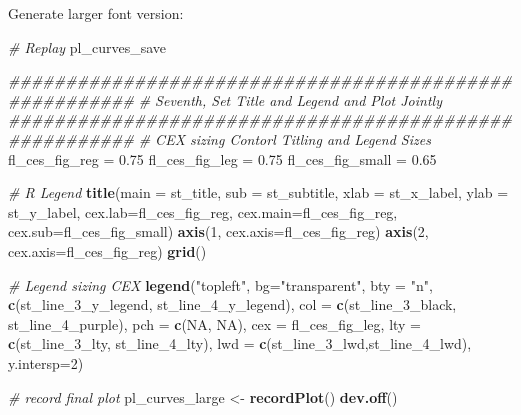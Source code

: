 \documentclass[
]{book}
\newenvironment{Shaded}{\begin{snugshade}}{\end{snugshade}}
\newcommand{\CommentTok}[1]{\textcolor[rgb]{0.56,0.35,0.01}{\textit{#1}}}
\newcommand{\DataTypeTok}[1]{\textcolor[rgb]{0.13,0.29,0.53}{#1}}
\newcommand{\DecValTok}[1]{\textcolor[rgb]{0.00,0.00,0.81}{#1}}
\newcommand{\FloatTok}[1]{\textcolor[rgb]{0.00,0.00,0.81}{#1}}
\newcommand{\KeywordTok}[1]{\textcolor[rgb]{0.13,0.29,0.53}{\textbf{#1}}}
\newcommand{\NormalTok}[1]{#1}
\newcommand{\OtherTok}[1]{\textcolor[rgb]{0.56,0.35,0.01}{#1}}
\newcommand{\StringTok}[1]{\textcolor[rgb]{0.31,0.60,0.02}{#1}}
\begin{document}
Generate larger font version:

\begin{Shaded}
\begin{Highlighting}[]
\CommentTok{# Replay}
\NormalTok{pl_curves_save}

\CommentTok{#######################################################}
\CommentTok{# Seventh, Set Title and Legend and Plot Jointly}
\CommentTok{#######################################################}
\CommentTok{# CEX sizing Contorl Titling and Legend Sizes}
\NormalTok{fl_ces_fig_reg =}\StringTok{ }\FloatTok{0.75}
\NormalTok{fl_ces_fig_leg =}\StringTok{ }\FloatTok{0.75}
\NormalTok{fl_ces_fig_small =}\StringTok{ }\FloatTok{0.65}

\CommentTok{# R Legend}
\KeywordTok{title}\NormalTok{(}\DataTypeTok{main =}\NormalTok{ st_title, }\DataTypeTok{sub =}\NormalTok{ st_subtitle, }\DataTypeTok{xlab =}\NormalTok{ st_x_label, }\DataTypeTok{ylab =}\NormalTok{ st_y_label,}
      \DataTypeTok{cex.lab=}\NormalTok{fl_ces_fig_reg,}
      \DataTypeTok{cex.main=}\NormalTok{fl_ces_fig_reg,}
      \DataTypeTok{cex.sub=}\NormalTok{fl_ces_fig_small)}
\KeywordTok{axis}\NormalTok{(}\DecValTok{1}\NormalTok{, }\DataTypeTok{cex.axis=}\NormalTok{fl_ces_fig_reg)}
\KeywordTok{axis}\NormalTok{(}\DecValTok{2}\NormalTok{, }\DataTypeTok{cex.axis=}\NormalTok{fl_ces_fig_reg)}
\KeywordTok{grid}\NormalTok{()}

\CommentTok{# Legend sizing CEX}
\KeywordTok{legend}\NormalTok{(}\StringTok{"topleft"}\NormalTok{,}
       \DataTypeTok{bg=}\StringTok{"transparent"}\NormalTok{,}
       \DataTypeTok{bty =} \StringTok{"n"}\NormalTok{,}
       \KeywordTok{c}\NormalTok{(st_line_}\DecValTok{3}\NormalTok{_y_legend, st_line_}\DecValTok{4}\NormalTok{_y_legend),}
       \DataTypeTok{col =} \KeywordTok{c}\NormalTok{(st_line_}\DecValTok{3}\NormalTok{_black, st_line_}\DecValTok{4}\NormalTok{_purple),}
       \DataTypeTok{pch =} \KeywordTok{c}\NormalTok{(}\OtherTok{NA}\NormalTok{, }\OtherTok{NA}\NormalTok{),}
       \DataTypeTok{cex =}\NormalTok{ fl_ces_fig_leg,}
       \DataTypeTok{lty =} \KeywordTok{c}\NormalTok{(st_line_}\DecValTok{3}\NormalTok{_lty, st_line_}\DecValTok{4}\NormalTok{_lty),}
       \DataTypeTok{lwd =} \KeywordTok{c}\NormalTok{(st_line_}\DecValTok{3}\NormalTok{_lwd,st_line_}\DecValTok{4}\NormalTok{_lwd),}
       \DataTypeTok{y.intersp=}\DecValTok{2}\NormalTok{)}
\end{Highlighting}
\end{Shaded}

\begin{Shaded}
\begin{Highlighting}[]
\CommentTok{# record final plot}
\NormalTok{pl_curves_large <-}\StringTok{ }\KeywordTok{recordPlot}\NormalTok{()}
\KeywordTok{dev.off}\NormalTok{()}
\end{Highlighting}
\end{Shaded}
\end{document}
